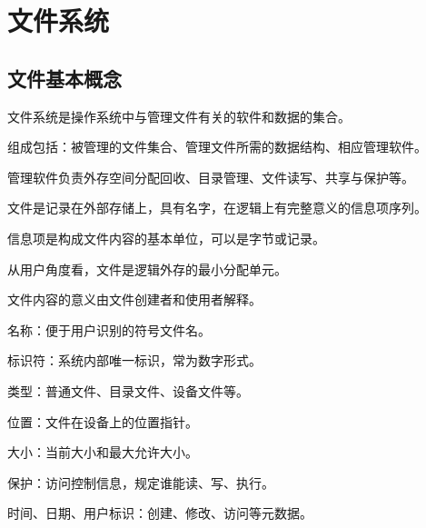 \chapter{文件系统}

\section{文件基本概念}
\begin{points}
  \item 文件系统是操作系统中与管理文件有关的软件和数据的集合。
  \item 组成包括：被管理的文件集合、管理文件所需的数据结构、相应管理软件。
  \item 管理软件负责外存空间分配回收、目录管理、文件读写、共享与保护等。
\end{points}


\begin{points}
  \item 文件是记录在外部存储上，具有名字，在逻辑上有完整意义的信息项序列。
  \item 信息项是构成文件内容的基本单位，可以是字节或记录。
  \item 从用户角度看，文件是逻辑外存的最小分配单元。
  \item 文件内容的意义由文件创建者和使用者解释。
\end{points}


\begin{points}
  \item 名称：便于用户识别的符号文件名。
  \item 标识符：系统内部唯一标识，常为数字形式。
  \item 类型：普通文件、目录文件、设备文件等。
  \item 位置：文件在设备上的位置指针。
  \item 大小：当前大小和最大允许大小。
  \item 保护：访问控制信息，规定谁能读、写、执行。
  \item 时间、日期、用户标识：创建、修改、访问等元数据。
\end{points}



